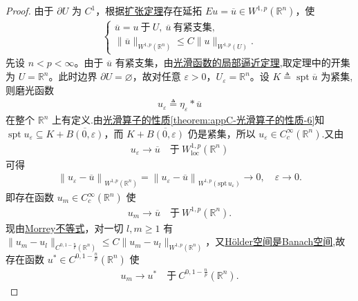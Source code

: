 \documentclass[../../main.tex]{subfiles}
\begin{document}
\begin{proof}
由于 $\partial U$ 为 $C^{1}$，根据\hyperref[theorem:ch05-扩张定理]{扩张定理}存在延拓 $Eu=\overline{u}\in W^{1,p}(\mathbb{R}^{n})$，使
\begin{align}
\begin{cases}
\overline{u}=u\ \text{于}\ U,\ \overline{u}\ \text{有紧支集},\\
\|\overline{u}\|_{W^{1,p}(\mathbb{R}^{n})}\leqslant C\|u\|_{W^{1,p}(U)}.
\end{cases}
\end{align}
先设 $n<p<\infty$。由于 $\overline{u}$ 有紧支集，由\hyperref[theorem:ch05-光滑函数的局部逼近定理]{光滑函数的局部逼近定理},取定理中的开集为 $U=\mathbb{R}^{n}$。此时边界 $\partial U=\varnothing$，故对任意 $\varepsilon>0$，$U_{\varepsilon}=\mathbb{R}^{n}$。设 $K\triangleq\operatorname{spt}\overline{u}$ 为紧集,则磨光函数
\begin{align*}
u_{\varepsilon}\triangleq\eta_{\varepsilon}*\overline{u}
\end{align*}
在整个 $\mathbb{R}^{n}$ 上有定义.由\hyperref[theorem:appC-光滑算子的性质]{光滑算子的性质\ref{theorem:appC-光滑算子的性质-6}}知$\operatorname{spt}u_{\varepsilon}\subseteq K+\overline{B(0,\varepsilon)}$，而 $K+\overline{B(0,\varepsilon)}$ 仍是紧集，所以 $u_{\varepsilon}\in C_{c}^{\infty}(\mathbb{R}^{n})$.又由
\begin{align*}
u_{\varepsilon}\to\overline{u}\quad\text{于}\ W^{1,p}_{\text{loc}}(\mathbb{R}^{n})
\end{align*}
可得
\begin{align*}
\left\| u_{\varepsilon}-\overline{u} \right\| _{W^{1,p}\left( \mathbb{R} ^n \right)}=\left\| u_{\varepsilon}-\overline{u} \right\| _{W^{1,p}\left( \mathrm{spt}\,u_{\varepsilon} \right)}\rightarrow 0,\quad \varepsilon \to 0.
\end{align*}
即存在函数 $u_{m}\in C^{\infty}_{c}(\mathbb{R}^{n})$ 使
\begin{align*}
u_{m}\to\overline{u}\quad\text{于}\ W^{1,p}(\mathbb{R}^{n}).
\end{align*}
现由\hyperref[theorem:Morrey不等式]{Morrey不等式}，对一切 $l,m\geqslant 1$ 有 $\|u_{m}-u_{l}\|_{C^{0,1-\frac{n}{p}}(\mathbb{R}^{n})}\leqslant C\|u_{m}-u_{l}\|_{W^{1,p}(\mathbb{R}^{n})}$，又\hyperref[theorem:ch05-holder空间Banach]{H\"older空间是Banach空间},故存在函数 $u^{*}\in C^{0,1-\frac{n}{p}}(\mathbb{R}^{n})$ 使
\begin{align*}
u_{m}\to u^{*}\quad\text{于}\ C^{0,1-\frac{n}{p}}(\mathbb{R}^{n}).
\end{align*}

\end{proof}
\end{document}
